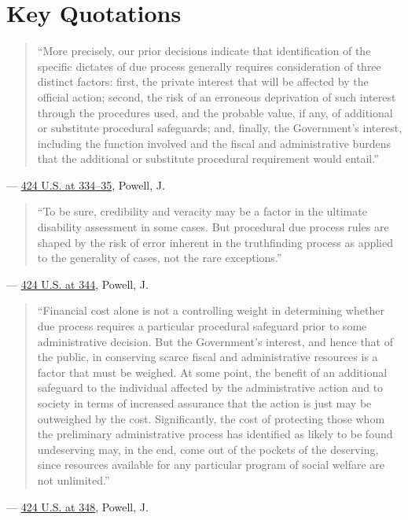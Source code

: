 \documentclass[12pt]{article}
\begin{document}
\section{Key Quotations}
\begin{quote}
``More precisely, our prior decisions indicate that identification of the specific dictates of due process generally requires consideration of three distinct factors: first, the private interest that will be affected by the official action; second, the risk of an erroneous deprivation of such interest through the procedures used, and the probable value, if any, of additional or substitute procedural safeguards; and, finally, the Government's interest, including the function involved and the fiscal and administrative burdens that the additional or substitute procedural requirement would entail.''
\end{quote}
\noindent --- \href{https://supreme.justia.com/cases/federal/us/424/319/}{424 U.S. at 334--35}, Powell, J.

\begin{quote}
``To be sure, credibility and veracity may be a factor in the ultimate disability assessment in some cases. But procedural due process rules are shaped by the risk of error inherent in the truthfinding process as applied to the generality of cases, not the rare exceptions.''
\end{quote}
\noindent --- \href{https://supreme.justia.com/cases/federal/us/424/319/}{424 U.S. at 344}, Powell, J.

\begin{quote}
``Financial cost alone is not a controlling weight in determining whether due process requires a particular procedural safeguard prior to some administrative decision. But the Government's interest, and hence that of the public, in conserving scarce fiscal and administrative resources is a factor that must be weighed. At some point, the benefit of an additional safeguard to the individual affected by the administrative action and to society in terms of increased assurance that the action is just may be outweighed by the cost. Significantly, the cost of protecting those whom the preliminary administrative process has identified as likely to be found undeserving may, in the end, come out of the pockets of the deserving, since resources available for any particular program of social welfare are not unlimited.''
\end{quote}
\noindent --- \href{https://supreme.justia.com/cases/federal/us/424/319/}{424 U.S. at 348}, Powell, J.
\end{document}
